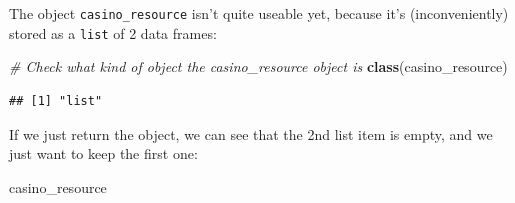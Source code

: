 \documentclass[
]{book}
\newenvironment{Shaded}{\begin{snugshade}}{\end{snugshade}}
\newcommand{\CommentTok}[1]{\textcolor[rgb]{0.56,0.35,0.01}{\textit{#1}}}
\newcommand{\KeywordTok}[1]{\textcolor[rgb]{0.13,0.29,0.53}{\textbf{#1}}}
\newcommand{\NormalTok}[1]{#1}
\begin{document}
The object \texttt{casino\_resource} isn't quite useable yet, because it's (inconveniently) stored as a \texttt{list} of 2 data frames:

\begin{Shaded}
\begin{Highlighting}[]
\CommentTok{# Check what kind of object the casino_resource object is}
\KeywordTok{class}\NormalTok{(casino_resource)}
\end{Highlighting}
\end{Shaded}

\begin{verbatim}
## [1] "list"
\end{verbatim}

If we just return the object, we can see that the 2nd list item is empty, and we just want to keep the first one:

\begin{Shaded}
\begin{Highlighting}[]
\NormalTok{casino_resource}
\end{Highlighting}
\end{Shaded}
\end{document}
